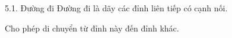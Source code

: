 \documentclass{beamer}
\begin{document}
\begin{frame}{5.1. Đường đi}
\Large
Đường đi là dãy các đỉnh liên tiếp có cạnh nối.

\vspace{0.3cm}
Cho phép di chuyển từ đỉnh này đến đỉnh khác.
\end{frame}
\end{document}
